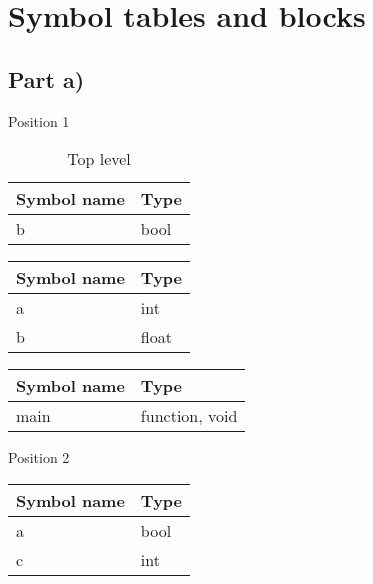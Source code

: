 \documentclass[paper=a4, fontsize=11pt]{scrartcl} %
\numberwithin{equation}{section} %
\numberwithin{figure}{section} %
\numberwithin{table}{section} %
\begin{document}
\newpage
\section{Symbol tables and blocks}

\subsection{Part a)}

Position 1

\begin{table}[ht!]
    \center
    \begin{tabular}{|l|l|}
    \hline
    Symbol name & Type           \\ \hline
    b        & bool \\ \hline
    \end{tabular}
    \caption{Top level}
\end{table}

\begin{table}[ht!]
    \begin{center}
    \begin{tabular}{|l|l|}
    \hline
    Symbol name & Type           \\ \hline
    a        & int   \\ \hline
    b        & float \\ \hline
    \end{tabular}
    \end{center}
\end{table}

\begin{table}[ht!]
    \center
    \begin{tabular}{|l|l|}
    \hline
    Symbol name & Type           \\ \hline
    main        & function, void \\ \hline
    \end{tabular}
\end{table}

Position 2

\begin{table}[ht!]
    \center
    \begin{tabular}{|l|l|}
    \hline
    Symbol name & Type           \\ \hline
    a        & bool \\ \hline
    c        & int \\ \hline
    \end{tabular}
\end{table}
\end{document}
